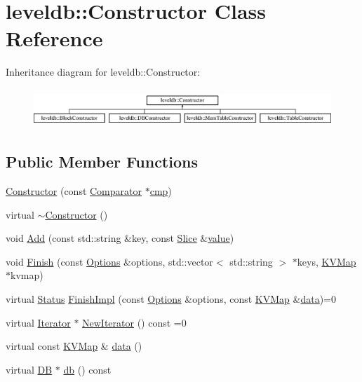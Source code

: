 \hypertarget{classleveldb_1_1_constructor}{}\section{leveldb\+:\+:Constructor Class Reference}
\label{classleveldb_1_1_constructor}
Inheritance diagram for leveldb\+:\+:Constructor\+:\begin{figure}[H]
\begin{center}
\leavevmode
\includegraphics[height=1.465969cm]{classleveldb_1_1_constructor}
\end{center}
\end{figure}
\subsection*{Public Member Functions}
\begin{DoxyCompactItemize}
\item 
\hyperlink{classleveldb_1_1_constructor_a5f4d21512e279769e881b2ae85129f08}{Constructor} (const \hyperlink{structleveldb_1_1_comparator}{Comparator} $\ast$\hyperlink{table__test_8cc_a87863e435922f0910ca8db43f02a6c0b}{cmp})
\item 
virtual \hyperlink{classleveldb_1_1_constructor_a643f9e1fc58b988f41b2a081398b04a1}{$\sim$\+Constructor} ()
\item 
void \hyperlink{classleveldb_1_1_constructor_a5bb35f87d196065b8357200922aae69f}{Add} (const std\+::string \&key, const \hyperlink{classleveldb_1_1_slice}{Slice} \&\hyperlink{cache_8cc_a0f61d63b009d0880a89c843bd50d8d76}{value})
\item 
void \hyperlink{classleveldb_1_1_constructor_a5c7f63378f8834cac3be93040e0e49fc}{Finish} (const \hyperlink{structleveldb_1_1_options}{Options} \&options, std\+::vector$<$ std\+::string $>$ $\ast$keys, \hyperlink{namespaceleveldb_aac1e50450147be263e08252c6700f7a7}{K\+V\+Map} $\ast$kvmap)
\item 
virtual \hyperlink{classleveldb_1_1_status}{Status} \hyperlink{classleveldb_1_1_constructor_a0f11e251cfbe990b5b0a4e7040923189}{Finish\+Impl} (const \hyperlink{structleveldb_1_1_options}{Options} \&options, const \hyperlink{namespaceleveldb_aac1e50450147be263e08252c6700f7a7}{K\+V\+Map} \&\hyperlink{classleveldb_1_1_constructor_a55a0363200d6e86d8beb3b15b75e3824}{data})=0
\item 
virtual \hyperlink{classleveldb_1_1_iterator}{Iterator} $\ast$ \hyperlink{classleveldb_1_1_constructor_a362b24b7194f605b655f5a136e0ae43c}{New\+Iterator} () const =0
\item 
virtual const \hyperlink{namespaceleveldb_aac1e50450147be263e08252c6700f7a7}{K\+V\+Map} \& \hyperlink{classleveldb_1_1_constructor_a55a0363200d6e86d8beb3b15b75e3824}{data} ()
\item 
virtual \hyperlink{classleveldb_1_1_d_b}{D\+B} $\ast$ \hyperlink{classleveldb_1_1_constructor_a207d6002cdb7ead23cecf6cfb4350a80}{db} () const 
\end{DoxyCompactItemize}


